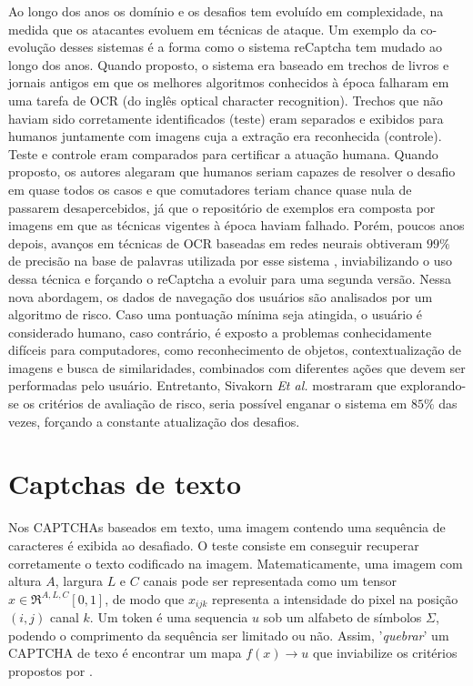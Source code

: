 Ao longo dos anos os domínio e os desafios tem evoluído em complexidade, na medida que os atacantes evoluem em técnicas de ataque. Um exemplo da co-evolução desses sistemas é a forma como o sistema reCaptcha \cite{recaptcha1} tem mudado ao longo dos anos. Quando proposto, o sistema era baseado em trechos de livros e jornais antigos em que os melhores algoritmos conhecidos à época falharam em uma tarefa de OCR (do inglês optical character recognition). Trechos que não haviam sido corretamente identificados (teste) eram separados e exibidos para humanos juntamente com imagens cuja a extração era reconhecida (controle). Teste e controle eram comparados para certificar a atuação humana. Quando proposto, os autores alegaram que humanos seriam capazes de resolver o desafio em quase todos os casos e que comutadores teriam chance quase nula de passarem desapercebidos, já que o repositório de exemplos era composta por imagens em que as técnicas vigentes à época haviam falhado. Porém, poucos anos depois, avanços em técnicas de OCR baseadas em redes neurais obtiveram $99\%$ de precisão na base de palavras utilizada por esse sistema \cite{captcha_break_2013}, inviabilizando o uso dessa técnica e forçando o reCaptcha a evoluir para uma segunda versão. Nessa nova abordagem, os dados de navegação dos usuários são analisados por um algoritmo de risco. Caso uma pontuação mínima seja atingida, o usuário é considerado humano, caso contrário, é exposto a problemas conhecidamente difíceis para computadores, como reconhecimento de objetos, contextualização de imagens e busca de similaridades, combinados com diferentes ações que devem ser performadas pelo usuário. Entretanto, Sivakorn \textit{Et al.} \cite{imarobot} mostraram que explorando-se os critérios de avaliação de risco, seria possível enganar o sistema em $85\%$ das vezes, forçando a constante atualização dos desafios.

\section{Captchas de texto}\label{sec:captchatexto}

Nos CAPTCHAs baseados em texto, uma imagem contendo uma sequência de caracteres é exibida ao desafiado. O teste consiste em conseguir recuperar corretamente o texto codificado na imagem. Matematicamente, uma imagem com altura $A$, largura $L$ e $C$ canais pode ser representada como um tensor $x \in \Re^{A,L,C}[0,1]$, de modo que  $x_{ijk}$ representa a intensidade do pixel na posição $(i,j)$ canal $k$. Um token é uma sequencia $u$ sob um alfabeto de símbolos $\Sigma$, podendo o comprimento da sequência ser limitado ou não. Assim, '\textit{quebrar}' um CAPTCHA de texo é encontrar um mapa $f(x) \rightarrow u$ que inviabilize os critérios propostos por \cite{lectures2005HIP}.

